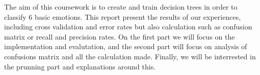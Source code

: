 The aim of this coursework is to create and train decision trees in order to classify 6 basic emotions.
This report present the results of our experiences, including cross validation and error rates but also
calculation such as confusion matrix or recall and precision rates. 
On the first part we will focus on the implementation and evalutation,
and the second part will focus on analysis of confusions matrix and all the calculation made. 
Finally, we will be interrested in the prunning part and explanations around this.

